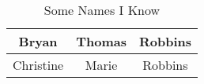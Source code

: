 \begin{table}
\centering
\caption{Some Names I Know}
\begin{tabular}{|c|c|c|} \hline
Bryan	&	Thomas	&	Robbins\\\hline
Christine	&	Marie	&	Robbins\\\hline
\hline\end{tabular}
\end{table}
